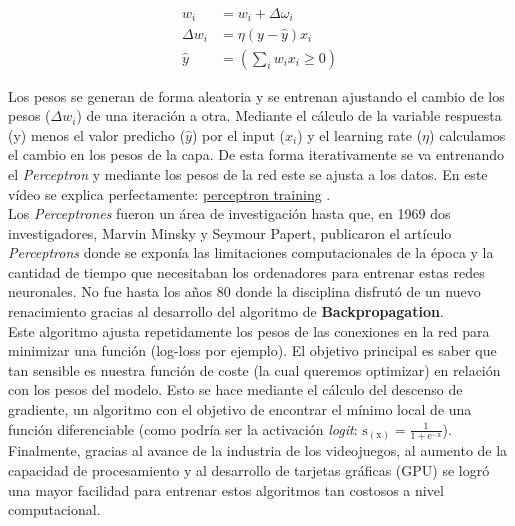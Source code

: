 \documentclass[10pt,riqno,a4paper,twoside]{article}\usepackage[]{graphicx}\usepackage[]{color}
\begin{document}
$$
\begin{aligned}
w_{i} &=w_{i}+\Delta \omega_{i} \\
\Delta w_{i} &=\eta(y-\hat{y}) x_{i} \\
\hat{y} &=\left(\sum_{i} w_{i} x_{i} \geq 0\right)
\end{aligned}
$$


Los pesos se generan de forma aleatoria y se entrenan ajustando el cambio de los pesos ($\Delta w_{i}$) de una iteraci\'{o}n a otra. Mediante el c\'{a}lculo de la variable respuesta (y) menos el valor predicho ($\hat{y}$) por el input ($x_{i}$) y el learning rate ($\eta$) calculamos el cambio en los pesos de la capa. De esta forma iterativamente se va entrenando el \textit{Perceptron} y mediante los pesos de la red este se ajusta a los datos. En este vídeo se explica perfectamente: \href{https://www.youtube.com/watch?v=5g0TPrxKK6o}{perceptron training} \cite{perceptron_train}. \\  


Los \textit{Perceptrones} fueron un \'{a}rea de investigaci\'{o}n hasta que, en 1969 dos investigadores, Marvin Minsky y Seymour Papert, publicaron el art\'{i}culo \textit{Perceptrons} \cite{marvin1969perceptrons} donde se exponía las limitaciones computacionales de la \'{e}poca y la cantidad de tiempo que necesitaban los ordenadores para entrenar estas redes neuronales. 
No fue hasta los años 80 donde la disciplina disfrut\'{o} de un nuevo renacimiento gracias al desarrollo del algoritmo de \textbf{Backpropagation}.\\

Este algoritmo ajusta repetidamente los pesos de las conexiones en la red para minimizar una función (log-loss por ejemplo). El objetivo principal es saber que tan sensible es nuestra funci\'{o}n de coste (la cual queremos optimizar) en relaci\'{o}n con los pesos del modelo. Esto se hace mediante el c\'{a}lculo del descenso de gradiente, un algoritmo con el objetivo de encontrar el m\'{i}nimo local de una funci\'{o}n diferenciable (como podr\'{i}a ser la activaci\'{o}n \textit{logit}: $\mathrm{s}_{(\mathrm{x})}=\frac{1}{1+\mathrm{e}^{-\mathrm{x}}}$).\\

Finalmente, gracias al avance de la industria de los videojuegos, al aumento de la capacidad de procesamiento y al desarrollo de tarjetas gráficas (GPU) se logró una mayor facilidad para entrenar estos algoritmos tan costosos a nivel computacional. \\
\end{document}

